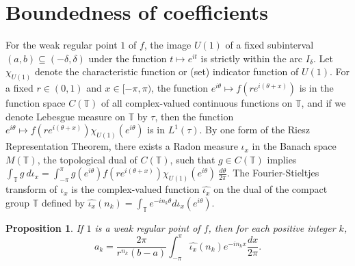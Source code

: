 \documentclass[11pt,a4paper]{article}
\newcommand{\T}{\mathbb{T}}
\def\LebT{\tau}
\newtheorem{proposition}[theorem]{Proposition}
\begin{document}
\section{Boundedness of coefficients}\label{CoeffSec}

For the weak regular point $1$ of $f$, the image $U(1)$ of a fixed subinterval $(a,b) \subseteq (-\delta,\delta) $ under the function $t \mapsto e^{it}$ is strictly within the arc $I_\delta$. Let $\chi_{U(1)}$ denote the characteristic function or (set) indicator function of $U(1)$. For a fixed $r \in (0,1)$ and $x \in [-\pi, \pi)$, the function $e^{i\theta} \mapsto f(re^{i(\theta+x)})$ is in the function space $C(\T)$ of all complex-valued continuous functions on $\T$, and if we denote Lebesgue measure on $\T$ by $\LebT$, then the function $e^{i\theta}\mapsto f(re^{i(\theta+x)})\chi_{U(1)}(e^{i\theta})$ is in $L^{1}(\LebT)$. By one form of the Riesz Representation Theorem, there exists a Radon measure $\iota_x$ in the Banach space $M(\T)$, the topological dual of $C(\T)$, such that $g\in C(\T)$ implies $\int_\T g\  d\iota_x= \int_{-\pi}^\pi g(e^{i\theta})f(re^{i(\theta+x)})\chi_{U(1)}(e^{i\theta})\  \frac{d\theta}{2\pi}$. The Fourier-Stieltjes transform of $\iota_x$ is the complex-valued function $\widehat{\iota_x}$ on the dual of the compact group $\T$ defined by $\widehat{\iota_x}(n_k) = \int_{\T} e^{-in_k\theta} d\iota_x(e^{i\theta})$.

\begin{proposition}\label{coeffProp}
If $1$ is a weak regular point of $f$, then for each positive integer $k$, 
\[
a_k = \frac{2\pi}{r^{n_k}(b-a)} \int_{-\pi}^\pi \widehat{\iota_x}(n_k) e^{-in_k x} \frac{dx}{2\pi}.
\]
\end{proposition}
\end{document}
